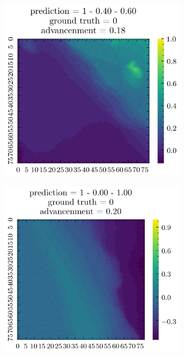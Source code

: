 \documentclass[../document.tex]{subfiles}
\begin{document}
\begin{figure}[H]
    \centering
    \begin{subfigure}[b]{0.19\textwidth}
        \includegraphics[width=\linewidth]{../img/5/quarry/false_negative/patch-2d-0.png}
    \end{subfigure}
    \begin{subfigure}[b]{0.19\textwidth}
        \includegraphics[width=\linewidth]{../img/5/quarry/false_negative/patch-2d-1.png}

\end{subfigure}
\end{figure}
\end{document}
